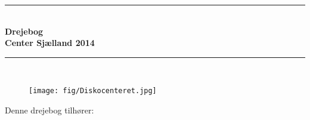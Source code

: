\begin{titlepage}
\centering
\rule{\textwidth}{0.5mm}\\
\vspace{0.3cm}
\Huge\bfseries\textsf{Drejebog}\\
\huge\textsf{Center Sjælland 2014}
\rule{\textwidth}{0.5mm}\\
\vspace{3cm}

\begin{figure}[H]
\centering
\texttt{[image: fig/Diskocenteret.jpg]}
\end{figure}

\vspace{3cm}

\flushleft\large\textsf{Denne drejebog tilhører:}
\flushleft\Huge\textsf{\forfatter}

\end{titlepage}